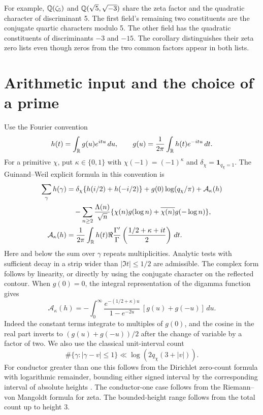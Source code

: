 \documentclass[11pt]{article}
\newcommand{\dd}{\,d}\newcommand{\supp}{\operatorname{supp}}
\newcommand{\one}{\mathbf1}
\begin{document}
For example, \(\mathbb Q(\zeta_5)\) and \(\mathbb Q(\sqrt5,\sqrt{-3})\) share the zeta factor and the quadratic character of discriminant 5. The first field's remaining two constituents are the conjugate quartic characters modulo 5. The other field has the quadratic constituents of discriminants \(-3\) and \(-15\). The corollary distinguishes their zeta zero lists even though zeros from the two common factors appear in both lists.

\section{Arithmetic input and the choice of a prime}
Use the Fourier convention
\[
 h(t)=\int_{\R}g(u)e^{itu}\dd u,\qquad
 g(u)=\frac1{2\pi}\int_{\R}h(t)e^{-itu}\dd t.
\]
For a primitive \(\chi\), put \(\kappa\in\{0,1\}\) with \(\chi(-1)=(-1)^\kappa\) and \(\delta_\chi=\one_{q_\chi=1}\). The Guinand--Weil explicit formula in this convention is \cite[eqs.~(2.1), (2.6)]{weil}
\begin{align}
 \sum_\gamma h(\gamma)
 &=\delta_\chi\{h(i/2)+h(-i/2)\}+g(0)\log(q_\chi/\pi)+\mathcal A_\kappa(h)\notag\\
 &\quad-\sum_{n\ge2}\frac{\Lambda(n)}{\sqrt n}
       \{\chi(n)g(\log n)+\overline{\chi(n)}g(-\log n)\}, \label{eq:weil}\\
 \mathcal A_\kappa(h)&=\frac1{2\pi}\int_\R h(t)\Re\frac{\Gamma'}{\Gamma}
             \left(\frac{1/2+\kappa+it}{2}\right)\dd t .\notag
\end{align}
Here and below the sum over \(\gamma\) repeats multiplicities. Analytic tests with sufficient decay in a strip wider than \(|\Im t|\le1/2\) are admissible. The complex form follows by linearity, or directly by using the conjugate character on the reflected contour. When \(g(0)=0\), the integral representation of the digamma function gives
\begin{equation}\label{eq:arch}
 \mathcal A_\kappa(h)=-\int_0^\infty
 \frac{e^{-(1/2+\kappa)u}}{1-e^{-2u}}\,[g(u)+g(-u)]\dd u .
\end{equation}
Indeed the constant terms integrate to multiples of \(g(0)\), and the cosine in the real part inverts to \((g(u)+g(-u))/2\) after the change of variable by a factor of two. We also use the classical unit-interval count
\begin{equation}\label{eq:count}
 \#\{\gamma:|\gamma-v|\le1\}\ll\log(2q_\chi(3+|v|)).
\end{equation}
For conductor greater than one this follows from the Dirichlet zero-count formula with logarithmic remainder, bounding either signed interval by the corresponding interval of absolute heights \cite{count}. The conductor-one case follows from the Riemann--von Mangoldt formula for zeta. The bounded-height range follows from the total count up to height 3.
\end{document}
